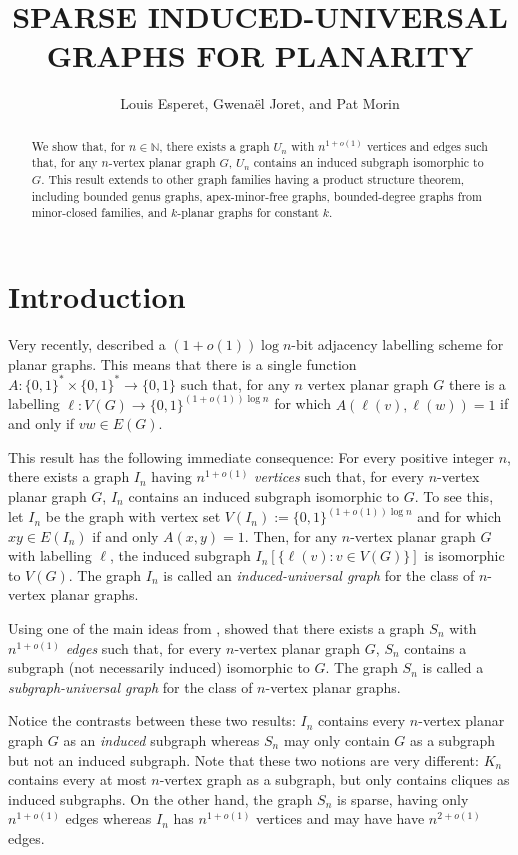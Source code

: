 \documentclass{patmorin}
\title{\MakeUppercase{Sparse Induced-Universal Graphs for Planarity}}
\author{Louis Esperet, Gwenaël Joret, and Pat Morin}
\newcommand{\N}{\mathbb{N}}
\begin{document}
\maketitle

\begin{abstract}
    We show that, for $n\in\N$, there exists a graph $U_n$ with $n^{1+o(1)}$ vertices and edges such that, for any $n$-vertex planar graph $G$, $U_n$ contains an induced subgraph isomorphic to $G$.  This result extends to other graph families having a product structure theorem, including bounded genus graphs, apex-minor-free graphs, bounded-degree graphs from minor-closed families, and $k$-planar graphs for constant $k$.
\end{abstract}

\section{Introduction}

Very recently, \citet{dujmovic.esperet.ea:adjacency} described a $(1+o(1))\log n$-bit adjacency labelling scheme for planar graphs.  This means that there is a single function $A:\{0,1\}^*\times\{0,1\}^* \to\{0,1\}$ such that, for any $n$ vertex planar graph $G$ there is a labelling $\ell:V(G)\to\{0,1\}^{(1+o(1))\log n}$ for which $A(\ell(v),\ell(w))=1$ if and only if $vw\in E(G)$.

This result has the following immediate consequence: For every positive integer $n$, there exists a graph $I_n$ having $n^{1+o(1)}$ \emph{vertices} such that, for every $n$-vertex planar graph $G$, $I_n$ contains an induced subgraph isomorphic to $G$.  To see this, let $I_n$ be the graph with vertex set $V(I_n):=\{0,1\}^{(1+o(1))\log n}$ and for which $xy\in E(I_n)$ if and only $A(x,y)=1$.  Then, for any $n$-vertex planar graph $G$ with labelling $\ell$, the induced subgraph $I_n[\{\ell(v):v\in V(G)\}]$ is isomorphic to $V(G)$.  The graph $I_n$ is called an \emph{induced-universal graph} for the class of $n$-vertex planar graphs.

Using one of the main ideas from \cite{dujmovic.esperet.ea:adjacency}, \citet{esperet.joret.ea:sparse} showed that there exists a graph $S_n$ with $n^{1+o(1)}$ \emph{edges} such that, for every $n$-vertex planar graph $G$, $S_n$ contains a subgraph (not necessarily induced) isomorphic to $G$.  The graph $S_n$ is called a \emph{subgraph-universal graph} for the class of $n$-vertex planar graphs.

Notice the contrasts between these two results: $I_n$ contains every $n$-vertex planar graph $G$ as an \emph{induced} subgraph whereas $S_n$ may only contain $G$ as a subgraph but not an induced subgraph.  Note that these two notions are very different: $K_n$ contains every at most $n$-vertex graph as a subgraph, but only contains cliques as induced subgraphs. On the other hand, the graph $S_n$ is sparse, having only $n^{1+o(1)}$ edges whereas $I_n$ has $n^{1+o(1)}$ vertices and may have have $n^{2+o(1)}$ edges.
\end{document}
